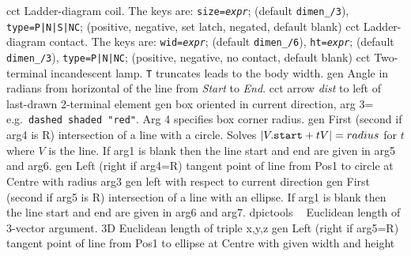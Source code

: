 %

%
  {cct}%
  {Ladder-diagram coil. The keys are:
   {\tt size={\sl expr}}; (default {\tt dimen\_/3}),
   {\tt type=P|N|S|NC}; (positive, negative, set latch, negated, default blank)
   }%
%
  {cct}%
  {Ladder-diagram contact. The keys are:
   {\tt wid={\sl expr}}; (default {\tt dimen\_/6}),
   {\tt ht={\sl expr}}; (default {\tt dimen\_/3}),
   {\tt type=P|N|NC}; (positive, negative, no contact, default blank)
   }%
%
  {cct}%
  {Two-terminal incandescent lamp. {\tt T} truncates leads to the body width.
   }%
%
  {gen}%
  {Angle in radians from horizontal of the line from {\sl Start}
  to {\sl End}.}%
%
  {cct}%
  {arrow {\sl dist} to left of last-drawn 2-terminal element
   }%
%
  {gen}%
  {box oriented in current direction, arg 3= e.g.\ {\tt dashed shaded "red"}.
   Arg 4 specifies box corner radius.}%
%
  {gen}%
  { First (second if arg4 is R) intersection of a line with a circle.
    Solves $|V.{\tt start} + tV| = {\sl radius}$ for $t$ where $V$ is the line.
    If arg1 is blank then the line start and end are given in arg5 and arg6.}%
%
  {gen}%
  { Left (right if arg4=R) tangent point of line
     from Pos1 to circle at Centre with radius arg3}%
%
  {gen}%
  {left with respect to current direction }%
%
  {gen}%
  { First (second if arg5 is R) intersection of a line with an ellipse.
    If arg1 is blank then the line start and end are given in arg6 and arg7.}%
%
  {dpictools}%
  {$\;\;$ Euclidean length of 3-vector argument.}%
%
  {3D}%
  {Euclidean length of triple x,y,z}%
%
  {gen}%
  { Left (right if arg5=R) tangent point of line
     from Pos1 to ellipse at Centre with given width and height}%
%
